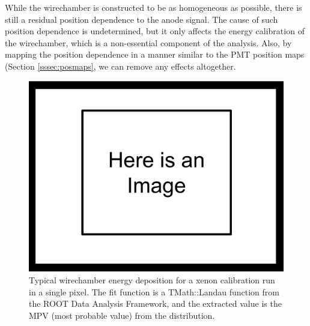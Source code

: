 While the wirechamber is constructed to be as homogeneous as possible, there is still a residual
position dependence to the anode signal. The cause of such position dependence is undetermined,
but it only affects the energy calibration of the wirechamber, which is
a non-essential component of the analysis. Also, by mapping the position dependence in a manner
similar to the PMT position maps (Section \ref{sssec:posmaps}, we can remove any effects altogether.

\begin{figure}[h]
  \centering
  \includegraphics[scale=0.3,page=1]{4-UCNACalibrations/ImageHolder.pdf}
  \caption{Typical wirechamber energy deposition for a xenon calibration run in a
    single pixel. The fit function is a TMath::Landau function from the ROOT Data Analysis
    Framework, and the extracted value is the MPV (most probable value) from the
    distribution.}
  \label{fig:xenonMWPCsignal}
\end{figure}

